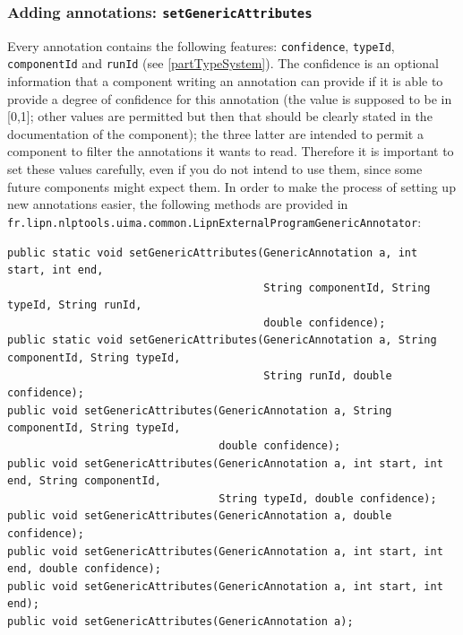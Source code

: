 \documentclass{article}
\newcommand{\packname}{fr.lipn.nlptools}
\newcommand{\uimaPackname}{\packname.uima}
\begin{document}
\subsubsection{Adding annotations: {\tt setGenericAttributes}}

Every annotation contains the following features: {\tt confidence}, {\tt typeId}, {\tt componentId} and {\tt runId} (see \ref{partTypeSystem}). The confidence is an optional information that a component writing an annotation can provide if it is able to provide a degree of confidence for this annotation (the value is supposed to be in [0,1]; other values are permitted but then that should be clearly stated in the documentation of the component); the three latter are intended to permit a component to filter the annotations it wants to read. Therefore it is important to set these values carefully, even if you do not intend to use them, since some future components might expect them. In order to make the process of setting up new annotations easier, the following methods are provided in\\ {\tt \uimaPackname.common.LipnExternalProgramGenericAnnotator}:


\begin{verbatim}	
public static void setGenericAttributes(GenericAnnotation a, int start, int end,
                                        String componentId, String typeId, String runId,
                                        double confidence);
public static void setGenericAttributes(GenericAnnotation a, String componentId, String typeId,
                                        String runId, double confidence);
public void setGenericAttributes(GenericAnnotation a, String componentId, String typeId,
                                 double confidence);
public void setGenericAttributes(GenericAnnotation a, int start, int end, String componentId, 
                                 String typeId, double confidence);
public void setGenericAttributes(GenericAnnotation a, double confidence);
public void setGenericAttributes(GenericAnnotation a, int start, int end, double confidence);
public void setGenericAttributes(GenericAnnotation a, int start, int end);
public void setGenericAttributes(GenericAnnotation a);
\end{verbatim}
\end{document}
